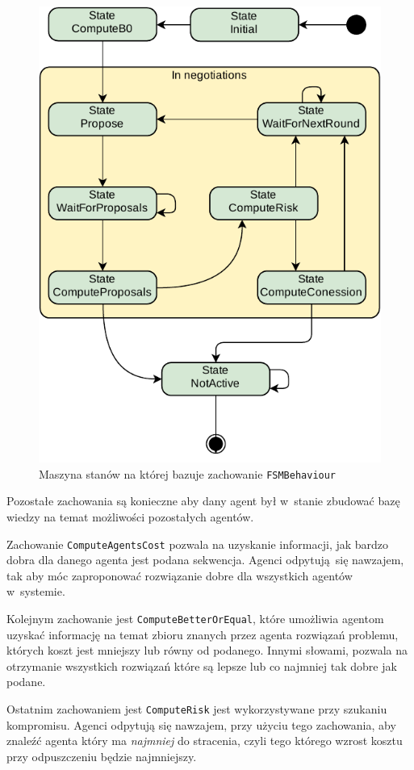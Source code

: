 \begin{figure}[h]
    \centering
    \includegraphics[width=\columnwidth]{figures/SAG-FactoryFSM.pdf}
    \caption{Maszyna stanów na której bazuje zachowanie \texttt{FSMBehaviour}}
    \label{fig:factory-fsm}
\end{figure}

Pozostałe zachowania są konieczne aby dany agent był w~stanie zbudować bazę wiedzy na temat możliwości pozostałych agentów.

Zachowanie \texttt{ComputeAgentsCost} pozwala na uzyskanie informacji, jak bardzo dobra dla danego agenta jest podana sekwencja.
Agenci odpytują się nawzajem, tak aby móc zaproponować rozwiązanie dobre dla wszystkich agentów w~systemie. 

Kolejnym zachowanie jest \texttt{ComputeBetterOrEqual}, które  umożliwia agentom uzyskać informację na temat zbioru znanych przez agenta rozwiązań problemu, których koszt jest mniejszy lub równy od podanego. Innymi słowami, pozwala na otrzymanie wszystkich rozwiązań które są lepsze lub co najmniej tak dobre jak podane.

Ostatnim zachowaniem jest \texttt{ComputeRisk} jest wykorzystywane przy szukaniu kompromisu. Agenci odpytują się nawzajem, przy użyciu tego zachowania, aby znaleźć agenta który ma \textit{najmniej} do stracenia, czyli tego którego wzrost kosztu przy odpuszczeniu będzie najmniejszy.